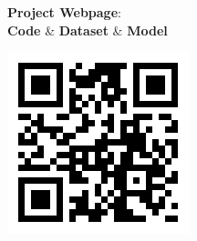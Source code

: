 \documentclass[portrait,a0paper,fontscale=0.292]{baposter}
\begin{document}
\begin{poster}
{\begin{minipage}[t]{0.4\textwidth}
        \vspace{-2em}
        \begin{center}
        \begin{minipage}{0.56\linewidth}
            \begin{center}
            \textbf{Project Webpage}: \\
            \vspace{0.5em}\textbf{Code} \& \textbf{Dataset} \& \textbf{Model}
            \end{center}
        \end{minipage}
        \begin{minipage}{0.19\linewidth}
            \begin{center}
                \includegraphics[width=\linewidth]{images/PS-FCN_QRCode.png}
            \end{center}
        \end{minipage}
        \end{center}
    \end{minipage}
}


\end{poster}
\end{document}
